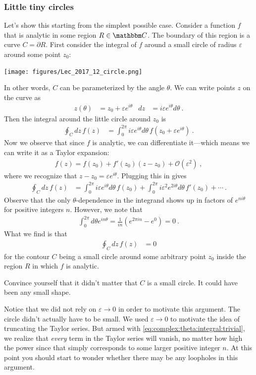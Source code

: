 \subsubsection{Little tiny circles}

Let's show this starting from the simplest possible case. Consider a function $f$ that is analytic in some region $R\in \mathbbm C$. The boundary of this region is a curve $C = \partial R$. First consider the integral of $f$ around a small circle of radius $\varepsilon$ around some point $z_0$:
\begin{center}
\texttt{[image: figures/Lec\_2017\_12\_circle.png]}
\end{center}
In other words, $C$ can be parameterized by the angle $\theta$. We can write points $z$ on the curve as
\begin{align}
	z(\theta) &= z_0 + \varepsilon e^{i\theta} 
	&
	dz &= i \varepsilon e^{i\theta} d\theta \ .
\end{align}
Then the integral around the little circle around $z_0$ is
\begin{align}
	\oint_C dz\, f(z) &= \int_0^{2\pi} i \varepsilon e^{i\theta} d\theta \, f\left( z_0 + \varepsilon e^{i\theta} \right) \ .
\end{align}
Now we observe that since $f$ is analytic, we can differentiate it---which means we can write it as a Taylor expansion:
\begin{align}
	f(z)
	 = f(z_0) + f'(z_0)(z-z_0) + \mathcal O(\varepsilon^2) \ ,
\end{align}
where we recognize that $z-z_0 = \varepsilon e^{i\theta}$. Plugging this in gives
\begin{align}
	\oint_C dz\, f(z) &= 
	\int_0^{2\pi} i \varepsilon e^{i\theta} d\theta \, f(z_0) 
	+
	\int_0^{2\pi} i \varepsilon^2 e^{2i\theta} d\theta \, f'(z_0) 
	+ \cdots
	\ .
\end{align}
Observe that the only $\theta$-dependence in the integrand shows up in factors of $e^{n i\theta}$ for positive integers $n$. However, we note that
\begin{align}
	\int_0^{2\pi} d\theta e^{in\theta} 
	= 
	\frac{1}{in} \left(e^{2\pi i n} - e^{0}\right)
	= 0 \ .
	\label{eq:complex:theta:integral:trivial}
\end{align}
What we find is that 
\begin{align}
	\oint_C dz\, f(z) &= 0
\end{align}
for the contour $C$ being a small circle around some arbitrary point $z_0$ inside the region $R$ in which $f$ is analytic. 
\begin{exercise}
Convince yourself that it didn't matter that $C$ is a small circle. It could have been any small shape. 
\end{exercise}
Notice that we did not rely on $\varepsilon\to 0$ in order to motivate this argument. The circle didn't actually have to be small. We used $\varepsilon\to 0$ to motivate the idea of truncating the Taylor series. But armed with \eqref{eq:complex:theta:integral:trivial}, we realize that \emph{every} term in the Taylor series will vanish, no matter how high the power since that simply corresponds to some larger positive integer $n$. At this point you should start to wonder whether there may be any loopholes in this argument.

